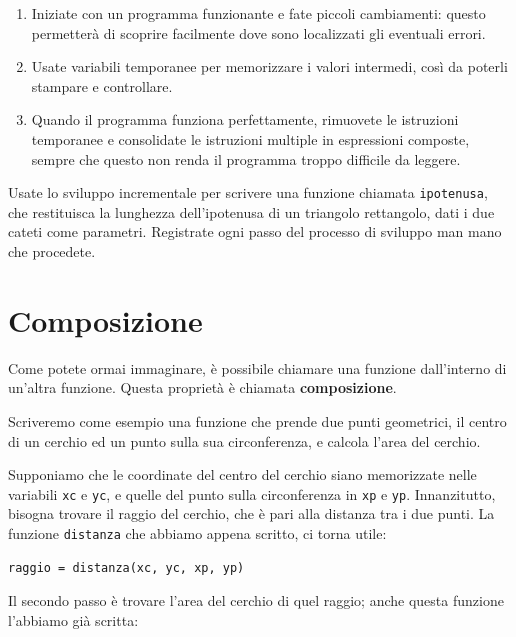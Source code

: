 \documentclass[10pt]{book}
\begin{document}
\begin{enumerate}

\item Iniziate con un programma funzionante e fate piccoli cambiamenti:
       questo permetterà di scoprire facilmente dove sono localizzati
       gli eventuali errori.

\item Usate variabili temporanee per memorizzare i valori intermedi, così
       da poterli stampare e controllare.

\item Quando il programma funziona perfettamente, rimuovete le istruzioni        temporanee e consolidate le istruzioni multiple in espressioni composte, sempre che questo non renda il programma troppo difficile da leggere.

\end{enumerate}

\vspace{0.2in}
\begin{exercise}

Usate lo sviluppo incrementale per scrivere una funzione
     chiamata {\tt ipotenusa}, che restituisca la lunghezza dell'ipotenusa di un
     triangolo rettangolo, dati i due cateti come parametri.
     Registrate ogni passo del processo di sviluppo man mano che 
     procedete.
\end{exercise}


\section{Composizione}

Come potete ormai immaginare, è possibile chiamare una funzione dall'interno di un'altra funzione. Questa proprietà è chiamata {\bf composizione}.

Scriveremo come esempio una funzione che prende due punti geometrici, il centro di un cerchio ed un punto sulla sua circonferenza, e calcola l'area del cerchio.

Supponiamo che le coordinate del centro del cerchio siano memorizzate nelle variabili {\tt xc} e {\tt yc}, e quelle del punto sulla circonferenza in {\tt xp} e {\tt yp}. Innanzitutto, bisogna trovare il raggio del cerchio, che è pari alla distanza tra i due punti. La funzione {\tt distanza} che abbiamo appena scritto, ci torna utile:

\begin{verbatim}
raggio = distanza(xc, yc, xp, yp)
\end{verbatim}
%
Il secondo passo è trovare l'area del cerchio di quel raggio; anche questa funzione l'abbiamo già scritta:
\end{document}
